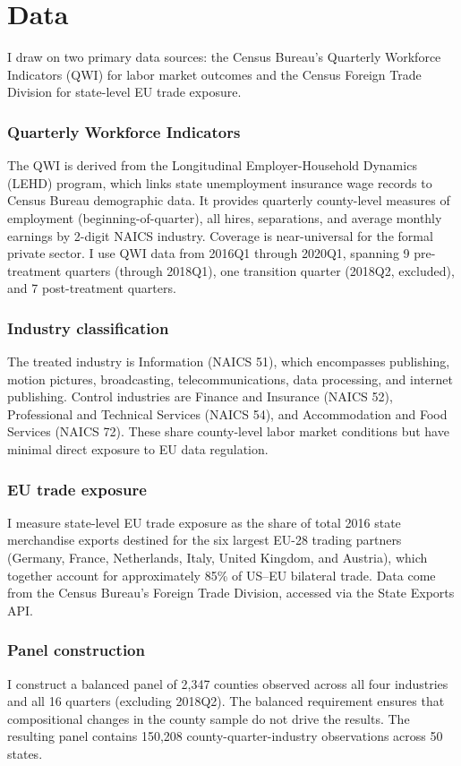 \documentclass[12pt]{article}
\begin{document}
\section{Data}

I draw on two primary data sources: the Census Bureau's Quarterly Workforce Indicators (QWI) for labor market outcomes and the Census Foreign Trade Division for state-level EU trade exposure.

\subsubsection*{Quarterly Workforce Indicators} The QWI is derived from the Longitudinal Employer-Household Dynamics (LEHD) program, which links state unemployment insurance wage records to Census Bureau demographic data. It provides quarterly county-level measures of employment (beginning-of-quarter), all hires, separations, and average monthly earnings by 2-digit NAICS industry. Coverage is near-universal for the formal private sector. I use QWI data from 2016Q1 through 2020Q1, spanning 9 pre-treatment quarters (through 2018Q1), one transition quarter (2018Q2, excluded), and 7 post-treatment quarters.

\subsubsection*{Industry classification} The treated industry is Information (NAICS 51), which encompasses publishing, motion pictures, broadcasting, telecommunications, data processing, and internet publishing. Control industries are Finance and Insurance (NAICS 52), Professional and Technical Services (NAICS 54), and Accommodation and Food Services (NAICS 72). These share county-level labor market conditions but have minimal direct exposure to EU data regulation.

\subsubsection*{EU trade exposure} I measure state-level EU trade exposure as the share of total 2016 state merchandise exports destined for the six largest EU-28 trading partners (Germany, France, Netherlands, Italy, United Kingdom, and Austria), which together account for approximately 85\% of US--EU bilateral trade. Data come from the Census Bureau's Foreign Trade Division, accessed via the State Exports API.

\subsubsection*{Panel construction} I construct a balanced panel of 2,347 counties observed across all four industries and all 16 quarters (excluding 2018Q2). The balanced requirement ensures that compositional changes in the county sample do not drive the results. The resulting panel contains 150,208 county-quarter-industry observations across 50 states.
\end{document}
